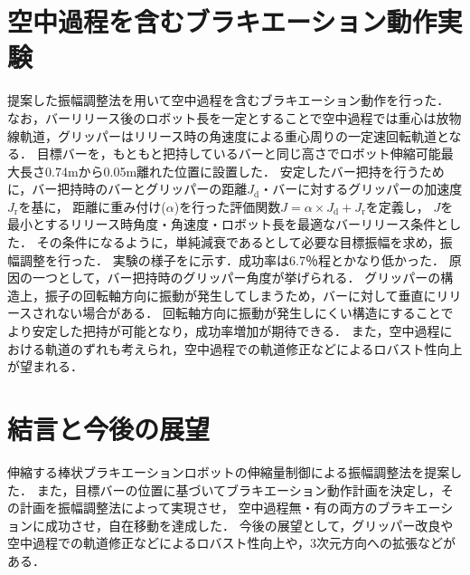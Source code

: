 \begin{small}
\section{空中過程を含むブラキエーション動作実験}
\vspace{-2mm}
提案した振幅調整法を用いて空中過程を含むブラキエーション動作を行った．
なお，バーリリース後のロボット長を一定とすることで空中過程では重心は放物線軌道，グリッパーはリリース時の角速度による重心周りの一定速回転軌道となる．
目標バーを，もともと把持しているバーと同じ高さでロボット伸縮可能最大長さ0.74mから0.05m離れた位置に設置した．
安定したバー把持を行うために，バー把持時のバーとグリッパーの距離$J_{\mathrm{d}}$・バーに対するグリッパーの加速度$J_{\mathrm{r}}$を基に，
距離に重み付け($\alpha$)を行った評価関数$J=\alpha \times J_{\mathrm{d}}+J_{\mathrm{r}}$を定義し，
$J$を最小とするリリース時角度・角速度・ロボット長を最適なバーリリース条件とした．
その条件になるように，単純減衰であるとして必要な目標振幅を求め，振幅調整を行った．
実験の様子をに示す．成功率は6.7％程とかなり低かった．
原因の一つとして，バー把持時のグリッパー角度が挙げられる．
グリッパーの構造上，振子の回転軸方向に振動が発生してしまうため，バーに対して垂直にリリースされない場合がある．
回転軸方向に振動が発生しにくい構造にすることでより安定した把持が可能となり，成功率増加が期待できる．
また，空中過程における軌道のずれも考えられ，空中過程での軌道修正などによるロバスト性向上が望まれる．
\section{結言と今後の展望}
\vspace{-2mm}
伸縮する棒状ブラキエーションロボットの伸縮量制御による振幅調整法を提案した．
また，目標バーの位置に基づいてブラキエーション動作計画を決定し，その計画を振幅調整法によって実現させ，
空中過程無・有の両方のブラキエーションに成功させ，自在移動を達成した．
今後の展望として，グリッパー改良や空中過程での軌道修正などによるロバスト性向上や，3次元方向への拡張などがある．
\vspace{-2mm}






{
\scriptsize %


}

\end{small}

